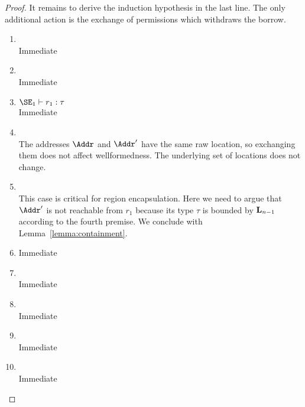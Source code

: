 \begin{proof}
  It remains to derive the induction hypothesis in the last line. The
  only additional action is the exchange of permissions which
  withdraws the borrow.
  \begin{enumerate}[({R}1)]
  \item {}\\
    Immediate
  \item {}\\
    Immediate
  \item $\SE_1 \vdash r_1 : \tau$\\
    Immediate
  \item {} \\
    The addresses $\Addr$ and $\Addr'$ have the same raw location, so
    exchanging them does not affect wellformedness. The underlying set
    of locations does not change.
  \item {} \\
    This case is critical for region encapsulation. Here we need to
    argue that $\Addr'$ is not reachable from $r_1$ because its type
    $\tau$ is bounded by $\mathbf{L}_{n-1}$ according to the fourth
    premise. We conclude with Lemma~\ref{lemma:containment}.
  \item {}
    Immediate
  \item {} \\
    Immediate
  \item {} \\
    Immediate
  \item {} \\
    Immediate
  \item {} \\
    Immediate
  \end{enumerate}


\end{proof}

